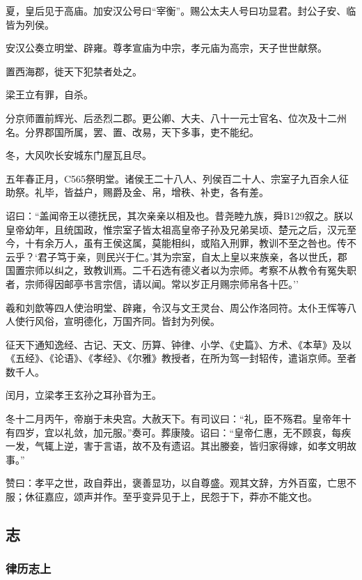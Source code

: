 \documentclass[]{article}
\begin{document}
夏，皇后见于高庙。加安汉公号曰``宰衡''。赐公太夫人号曰功显君。封公子安、临皆为列侯。

安汉公奏立明堂、辟雍。尊孝宣庙为中宗，孝元庙为高宗，天子世世献祭。

置西海郡，徙天下犯禁者处之。

梁王立有罪，自杀。

分京师置前辉光、后丞烈二郡。更公卿、大夫、八十一元士官名、位次及十二州名。分界郡国所属，罢、置、改易，天下多事，吏不能纪。

冬，大风吹长安城东门屋瓦且尽。

五年春正月，C565祭明堂。诸侯王二十八人、列侯百二十人、宗室子九百余人征助祭。礼毕，皆益户，赐爵及金、帛，增秩、补吏，各有差。

诏曰：``盖闻帝王以德抚民，其次亲亲以相及也。昔尧睦九族，舜B129叙之。朕以皇帝幼年，且统国政，惟宗室子皆太祖高皇帝子孙及兄弟吴顷、楚元之后，汉元至今，十有余万人，虽有王侯这属，莫能相纠，或陷入刑罪，教训不至之咎也。传不云乎？`君子笃于亲，则民兴于仁。'其为宗室，自太上皇以来族亲，各以世氏，郡国置宗师以纠之，致教训焉。二千石选有德义者以为宗师。考察不从教令有冤失职者，宗师得因邮亭书言宗信，请以闻。常以岁正月赐宗师帛各十匹。''

羲和刘歆等四人使治明堂、辟雍，令汉与文王灵台、周公作洛同符。太仆王恽等八人使行风俗，宣明德化，万国齐同。皆封为列侯。

征天下通知逸经、古记、天文、历算、钟律、小学、《史篇》、方术、《本草》及以《五经》、《论语》、《孝经》、《尔雅》教授者，在所为驾一封轺传，遣诣京师。至者数千人。

闰月，立梁孝王玄孙之耳孙音为王。

冬十二月丙午，帝崩于未央宫。大赦天下。有司议曰：``礼，臣不殇君。皇帝年十有四岁，宜以礼敛，加元服。''奏可。葬康陵。诏曰：``皇帝仁惠，无不顾哀，每疾一发，气辄上逆，害于言语，故不及有遗诏。其出媵妾，皆归家得嫁，如孝文明故事。''

赞曰：孝平之世，政自莽出，褒善显功，以自尊盛。观其文辞，方外百蛮，亡思不服；休征嘉应，颂声并作。至乎变异见于上，民怨于下，莽亦不能文也。

\hypertarget{header-n1206}{%
\subsection{志}\label{header-n1206}}

\hypertarget{header-n1207}{%
\subsubsection{律历志上}\label{header-n1207}}
\end{document}
